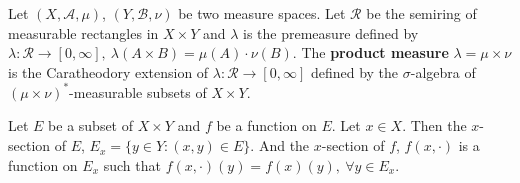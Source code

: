 \begin{definition}
	Let $(X,\mathcal{A},\mu)$, $(Y,\mathcal{B},\nu)$ be two measure spaces.
	Let $\mathcal{R}$ be the semiring of measurable rectangles in $X \times Y$ and $\lambda$ is the premeasure defined by $\lambda : \mathcal{R} \to [0,\infty],\ \lambda(A \times B) = \mu(A) \cdot \nu(B)$.
	The \textbf{product measure} $\lambda = \mu \times \nu$ is the Caratheodory extension of $\lambda : \mathcal{R} \to [0,\infty]$ defined by the $\sigma$-algebra of $(\mu \times \nu)^\ast$-measurable subsets of $X \times Y$.
\end{definition}

\begin{definition}[$x$-section]
	Let $E$ be a subset of $X \times Y$ and $f$ be a function on $E$.
	Let $x \in X$.
	Then the $x$-section of $E$, $E_x = \{ y \in Y : (x,y) \in E \}$.
	And the $x$-section of $f$, $f(x,\cdot)$ is a function on $E_x$ such that $f(x,\cdot)(y) = f(x)(y),\ \forall y \in E_x$.
\end{definition}

